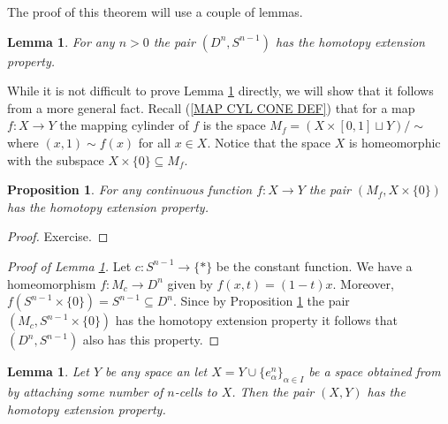 \documentclass[11pt, letterpaper, oneside]{report}
\theoremstyle{pplain}
\newtheorem{lemma}[theorem]{Lemma}
\newtheorem{proposition}[theorem]{Proposition}
\theoremstyle{ddefinition}
\theoremstyle{nnn}
\theoremstyle{eexercise}
\begin{document}
The proof of this theorem will use a couple of lemmas.


\begin{lemma}
\label{DN SN-1 HEP LEMMA}
For any $n> 0$  the pair $(D^{n}, S^{n-1})$ has the homotopy extension property. 
\end{lemma}

While it is not difficult to prove Lemma \ref{DN SN-1 HEP LEMMA} directly, we will show that it 
follows from a more general fact.  Recall (\ref{MAP CYL CONE DEF}) that for a map $f\colon X\to Y$ the mapping cylinder of $f$ is the space $M_{f} = (X \times [0, 1] \sqcup Y) /{\sim}$ where  $(x, 1) \sim f(x)$ for all $x\in X$. Notice that the space $X$ is homeomorphic with the subspace $X\times \{0\} \subseteq M_{f}$. 



\begin{proposition}
\label{MAP CYL HEP PROP}
For any continuous function $f\colon X \to Y$ the pair $(M_{f}, X\times \{0\})$ has the homotopy extension property. 
\end{proposition}

\begin{proof}
Exercise. 
\end{proof}


\begin{proof}[Proof of Lemma \ref{DN SN-1 HEP LEMMA}]
Let $c\colon S^{n-1} \to \{\ast\}$ be the constant function. We have a homeomorphism 
$f \colon M_{c} \to D^{n}$ given by $f(x, t) = (1-t)x$. Moreover, $f(S^{n-1}\times \{0\}) = S^{n-1}\subseteq D^{n}$. Since by Proposition \ref{MAP CYL HEP PROP} the pair $(M_{c}, S^{n-1}\times \{0\})$ has the homotopy extension property it follows that $(D^{n}, S^{n-1})$ also has this property. 
\end{proof}

\begin{lemma}
\label{HEP CELL ATTACHMENT LEMMA}
Let $Y$ be any space an let $X = Y\cup\{e^{n}_{\alpha}\}_{\alpha \in I}$ be a space obtained from 
by attaching some number of $n$-cells to $X$. Then the pair $(X, Y)$ has the homotopy 
extension property.   
\end{lemma}
\end{document}
